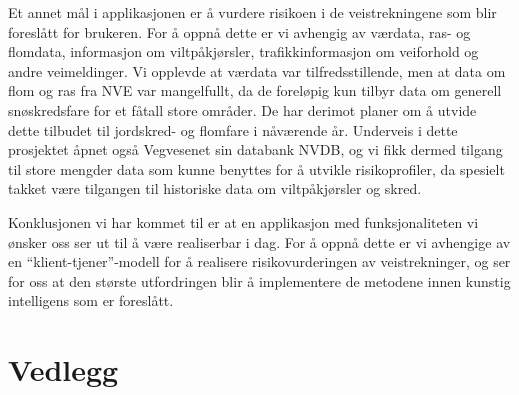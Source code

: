 \documentclass[a4paper,norsk,oneside]{book}
\begin{document}
Et annet mål i applikasjonen er å vurdere risikoen i de veistrekningene som blir foreslått for brukeren. For å oppnå dette er vi avhengig av værdata, ras- og flomdata, informasjon om viltpåkjørsler, trafikkinformasjon om veiforhold og andre veimeldinger. Vi opplevde at værdata var tilfredsstillende, men at data om flom og ras fra NVE var mangelfullt, da de foreløpig kun tilbyr data om generell snøskredsfare for et fåtall store områder. De har derimot planer om å utvide dette tilbudet til jordskred- og flomfare i nåværende år. Underveis i dette prosjektet åpnet også Vegvesenet sin databank NVDB, og vi fikk dermed tilgang til store mengder data som kunne benyttes for å utvikle risikoprofiler, da spesielt takket være tilgangen til historiske data om viltpåkjørsler og skred.

Konklusjonen vi har kommet til er at en applikasjon med funksjonaliteten vi ønsker oss ser ut til å være realiserbar i dag. For å oppnå dette er vi avhengige av en “klient-tjener”-modell for å realisere risikovurderingen av veistrekninger, og ser for oss at den største utfordringen blir å implementere de metodene innen kunstig intelligens som er foreslått.



\backmatter



\chapter{Vedlegg}
\label{cha:appendices}
\end{document}
